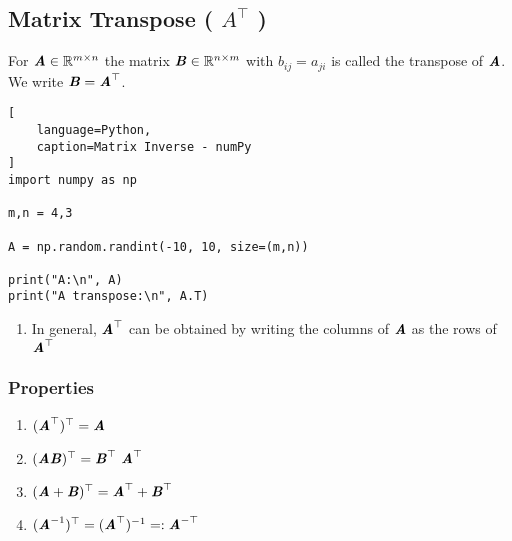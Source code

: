 \subsection{Matrix Transpose ( $A^{\top}$ ) \cite{mfml/book/mml/Deisenroth-Faisal-Ong}}

For $\text{\textbf{\textit{A}}} \in \mathbb{R}^{m\times n}$ the matrix $\text{\textbf{\textit{B}}} \in \mathbb{R}^{n\times m}$ with $b_{ij} = a_{ji}$ is called the transpose of $\text{\textbf{\textit{A}}}$. 
We write $\text{\textbf{\textit{B}}} = \text{\textbf{\textit{A}}}^\top$.
\hfill \cite{mfml/book/mml/Deisenroth-Faisal-Ong}






\begin{lstlisting}[
    language=Python,
    caption=Matrix Inverse - numPy
]
import numpy as np

m,n = 4,3

A = np.random.randint(-10, 10, size=(m,n))

print("A:\n", A)
print("A transpose:\n", A.T)
\end{lstlisting}







\begin{enumerate}
    \item In general, $\text{\textbf{\textit{A}}}^\top$ can be obtained by writing the columns of $\text{\textbf{\textit{A}}}$ as the rows of $\text{\textbf{\textit{A}}}^\top$
    \hfill \cite{mfml/book/mml/Deisenroth-Faisal-Ong}
\end{enumerate}



\subsubsection{Properties}

\begin{multicols}{2}
\begin{enumerate}
    \item $(\text{\textbf{\textit{A}}}^\top)^\top = \text{\textbf{\textit{A}}}$
    \hfill \cite{mfml/book/mml/Deisenroth-Faisal-Ong}

    \item $(\text{\textbf{\textit{AB}}})^\top = \text{\textbf{\textit{B}}}^\top\ \text{\textbf{\textit{A}}}^\top$
    \hfill \cite{mfml/book/mml/Deisenroth-Faisal-Ong}

    \item $(\text{\textbf{\textit{A}}}+\text{\textbf{\textit{B}}})^\top = \text{\textbf{\textit{A}}}^\top + \text{\textbf{\textit{B}}}^\top$
    \hfill \cite{mfml/book/mml/Deisenroth-Faisal-Ong}

    \item $(\text{\textbf{\textit{A}}}^{-1})^\top = (\text{\textbf{\textit{A}}}^\top)^{-1} =: \text{\textbf{\textit{A}}}^{-\top}$
    \hfill \cite{mfml/book/mml/Deisenroth-Faisal-Ong}

\end{enumerate}
\end{multicols}







